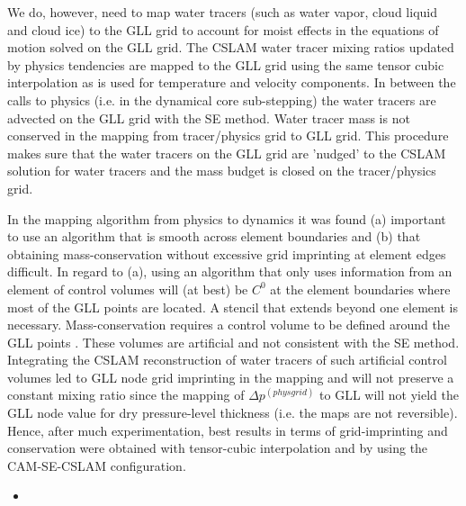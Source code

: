 We do, however, need to map water tracers (such as water vapor, cloud liquid and cloud ice) to the GLL grid to account for moist effects in the equations of motion solved on the GLL grid. The CSLAM water tracer mixing ratios updated by physics tendencies are mapped to the GLL grid using the same tensor cubic interpolation as is used for temperature and velocity components. In between the calls to physics (i.e. in the dynamical core sub-stepping) the water tracers are advected on the GLL grid with the SE method. Water tracer mass is not conserved in the mapping from tracer/physics grid to GLL grid. This procedure makes sure that the water tracers on the GLL grid are 'nudged' to the CSLAM solution for water tracers and the mass budget is closed on the tracer/physics grid.

In the mapping algorithm from physics to dynamics it was found (a) important to use an algorithm that is smooth across element boundaries and (b) that obtaining mass-conservation without excessive grid imprinting at element edges difficult. In regard to (a), using an algorithm that only uses information from an element of control volumes will (at best) be $C^0$ at the element boundaries where most of the GLL points are located. A stencil that extends beyond one element is necessary. Mass-conservation requires a control volume to be defined around the GLL points \cite[see, .e.g., Figure \ref{fig:cv-grids} in this paper or Figure 8b in ][]{UDJ2016MWR}. These volumes are artificial and not consistent with the SE method. Integrating the CSLAM reconstruction of water tracers of such artificial control volumes led to GLL node grid imprinting in the mapping and will not preserve a constant mixing ratio since the mapping of $\Delta p^{(physgrid)}$ to GLL will not yield the GLL node value for dry pressure-level thickness (i.e. the maps are not reversible). Hence, after much experimentation, best results in terms of grid-imprinting and conservation were obtained with tensor-cubic interpolation and by using the CAM-SE-CSLAM configuration.

\begin{itemize}
\item {}
\end{itemize}



